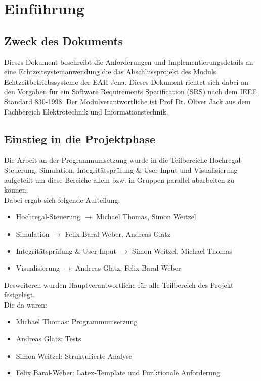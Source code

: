 \section{Einführung}
\subsection{Zweck des Dokuments}
Dieses Dokument beschreibt die Anforderungen und Implementierungsdetails an eine Echtzeitsystemanwendung die das Abschlussprojekt des Moduls Echtzeitbetriebssysteme der EAH Jena. Dieses Dokument richtet sich dabei an den Vorgaben für ein Software Requirements Specification (SRS) nach dem \href{https://de.wikipedia.org/wiki/Software_Requirements_Specification}{IEEE Standard 830-1998}. Der Modulverantwortliche ist Prof Dr. Oliver Jack aus dem Fachbereich Elektrotechnik und Informationstechnik.\\

\subsection{Einstieg in die Projektphase}
Die Arbeit an der Programmumsetzung wurde in die Teilbereiche Hochregal-Steuerung, Simulation, Integritätsprüfung & User-Input und Visualisierung aufgeteilt um diese Bereiche allein bzw. in Gruppen parallel  abarbeiten zu können.\\
Dabei ergab sich folgende Aufteilung:
\begin{itemize} 
	\item Hochregal-Steuerung $\rightarrow$ Michael Thomas, Simon Weitzel
	\item Simulation $\rightarrow$ Felix Baral-Weber, Andreas Glatz
	\item Integritätsprüfung & User-Input $\rightarrow$ Simon Weitzel, Michael Thomas
	\item Visualisierung $\rightarrow$ Andreas Glatz, Felix Baral-Weber
\end{itemize}

Desweiteren wurden Hauptverantwortliche für alle Teilbereich des Projekt festgelegt.\\

Die da wären:\\
\begin{itemize} 
	\item Michael Thomas: Programmumsetzung
	\item Andreas Glatz: Tests
	\item Simon Weitzel: Strukturierte Analyse
	\item Felix Baral-Weber: Latex-Template und Funktionale Anforderung
\end{itemize}